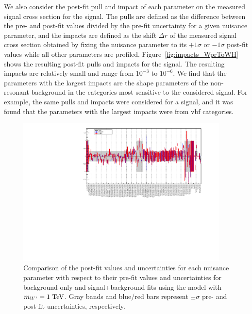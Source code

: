 We also consider the post-fit pull and impact of each parameter on the measured signal cross section for the \WprtoWH signal.
The pulls are defined as the difference between the pre- and post-fit values divided by the pre-fit uncertainty for a given nuisance parameter, and the impacts are defined as the shift $\Delta r$ of the measured signal cross section obtained by fixing the nuisance parameter to its $+1\sigma$ or $-1\sigma$ post-fit values while all other parameters are profiled.
Figure~\ref{fig:impacts_WprToWH} shows the resulting post-fit pulls and impacts for the \WprtoWH signal.
The resulting impacts are relatively small and range from $10^{-3}$ to $10^{-6}$.
We find that the parameters with the largest impacts are the shape parameters of the non-resonant background in the categories most sensitive to the considered signal.
For example, the same pulls and impacts were considered for a \VBF signal, and it was found that the parameters with the largest impacts were from vbf categories.

\begin{figure}[htbp]
  \centering
  \includegraphics[width=0.95\textwidth,angle=270]{fig/fitValidation/nuisances_WprToWH1000.pdf}
  \caption{
    Comparison of the post-fit values and uncertainties for each nuisance parameter with respect to their pre-fit values and uncertainties for background-only and signal+background fits using the \DY\WprtoWH model with $m_{\Wpr}=1\unit{TeV}$.
    Gray bands and blue/red bars represent $\pm\sigma$ pre- and post-fit uncertainties, respectively.
  }
  \label{fig:nuisances}
\end{figure}

